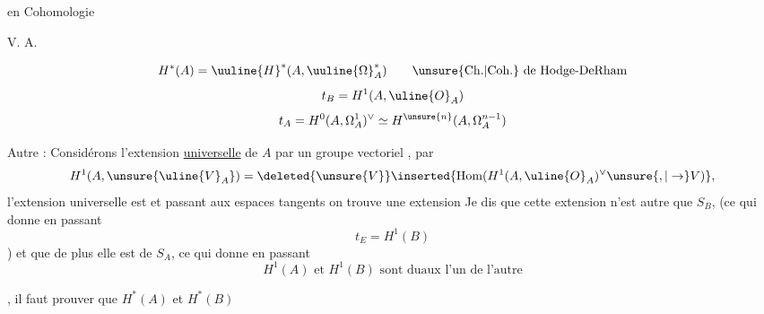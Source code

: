  en Cohomologie

 V. A.



\[
H^*(A)=\uuline{H}^{*}(A,\uuline{\Omega}^{*}_{A})
\qquad \text{\unsure{Ch.|Coh.} de Hodge-DeRham}
\]
\[
t_B=H^1(A,\uline{O}_A)
\]
\[
t_A=H^0(A,\Omega_A^1)^\vee\simeq H^{\unsure{n}}(A,\Omega_A^{n-1})
\]


Autre  : Considérons l'extension \uline{universelle} de $A$ par un groupe vectoriel ,     par
\[
H^1(A,\unsure{\uline{V}_A})=\deleted{\unsure{V}}\inserted{\operatorname{Hom}(H^1(A,\uline{O}_A)^\vee\unsure{,|\to}V)},
\]
 l'extension universelle est
et passant aux espaces tangents on trouve une extension
Je dis que cette extension n'est autre que $S_B$, (ce qui donne en passant
\[
t_E=H^1(B)
\]
)
et que de plus elle est \uline{} de $S_A$, ce qui donne en passant
\[
\boxed{H^1(A)\text{ et }H^1(B)\text{ sont duaux l'un de l'autre}}
\]

, il faut prouver que $H^*(A)$ et $H^*(B)$


